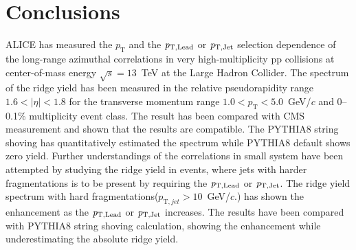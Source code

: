 
\section{Conclusions}
\label{sec:summary}


ALICE has measured the $p_{\mathrm T}$ and the $\it{p}_{\rm{T,Lead}}$ or $\it{p}_{\rm{T,Jet}}$ selection dependence of the long-range azimuthal correlations in very high-multiplicity pp collisions at center-of-mass energy $\sqrt{s} = 13$~TeV at the Large Hadron Collider. The spectrum of the ridge yield has been measured in the relative pseudorapidity range $1.6 < |\eta| < 1.8$ for the transverse momentum range $1.0 < p_{\mathrm T} < 5.0$~GeV/$c$ and 0--0.1\% multiplicity event class. The result has been compared with CMS measurement and shown that the results are compatible. The PYTHIA8 string shoving has quantitatively estimated the spectrum while PYTHIA8 default shows zero yield. Further understandings of the correlations in small system have been attempted by studying the ridge yield in events, where jets with harder fragmentations is to be present by requiring the $\it{p}_{\rm{T,Lead}}$ or $\it{p}_{\rm{T,Jet}}$. The ridge yield spectrum with hard fragmentations($p_{\mathrm T, jet} > 10$~GeV/$c$.) has shown the enhancement as the $\it{p}_{\rm{T,Lead}}$ or $\it{p}_{\rm{T,Jet}}$ increases. The results have been compared with PYTHIA8 string shoving calculation, showing the enhancement while underestimating the absolute ridge yield. 



